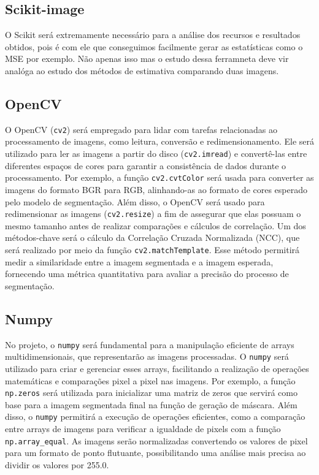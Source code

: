 \subsection{Scikit-image}

O Scikit será extremamente necessário para a análise dos recursos e resultados obtidos, pois é com ele que conseguimos facilmente gerar as estatísticas como o MSE por exemplo.
Não apenas isso mas o estudo dessa ferramneta deve vir analóga ao estudo dos métodos de estimativa comparando duas imagens.

\subsection{OpenCV}

O OpenCV (\texttt{cv2}) será empregado para lidar com tarefas relacionadas ao processamento de imagens, como leitura, conversão e redimensionamento.
Ele será utilizado para ler as imagens a partir do disco (\texttt{cv2.imread}) e convertê-las entre diferentes espaços de cores para garantir a consistência de dados durante o processamento. Por exemplo, a função \texttt{cv2.cvtColor} será usada para converter as imagens do formato BGR para RGB, alinhando-as ao formato de cores esperado pelo modelo de segmentação. Além disso, o OpenCV será usado para redimensionar as imagens (\texttt{cv2.resize}) a fim de assegurar que elas possuam o mesmo tamanho antes de realizar comparações e cálculos de correlação. Um dos métodos-chave será o cálculo da Correlação Cruzada Normalizada (NCC), que será realizado por meio da função \texttt{cv2.matchTemplate}. Esse método permitirá medir a similaridade entre a imagem segmentada e a imagem esperada, fornecendo uma métrica quantitativa para avaliar a precisão do processo de segmentação.

\subsection{Numpy}
No projeto, o \texttt{numpy} será fundamental para a manipulação eficiente de arrays multidimensionais, que representarão as imagens processadas. O \texttt{numpy} será utilizado para criar e gerenciar esses arrays, facilitando a realização de operações matemáticas e comparações pixel a pixel nas imagens. Por exemplo, a função \texttt{np.zeros} será utilizada para inicializar uma matriz de zeros que servirá como base para a imagem segmentada final na função de geração de máscara. Além disso, o \texttt{numpy} permitirá a execução de operações eficientes, como a comparação entre arrays de imagens para verificar a igualdade de pixels com a função \texttt{np.array\_equal}. As imagens serão normalizadas convertendo os valores de pixel para um formato de ponto flutuante, possibilitando uma análise mais precisa ao dividir os valores por 255.0.

